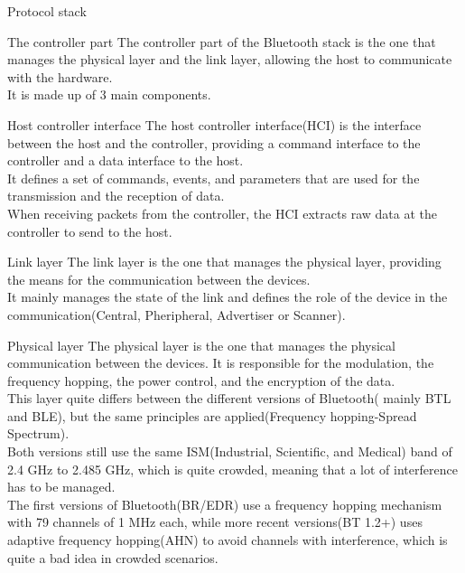 \begin{section}{Protocol stack}
  \begin{subsection}{The controller part}
    The controller part of the Bluetooth stack is the one that manages the physical layer and the
    link layer, allowing the host to communicate with the hardware.\\
    It is made up of 3 main components.
    \begin{subsubsection}{Host controller interface}
      The host controller interface(HCI) is the interface between the host and the controller, 
      providing a command interface to the controller and a data interface to the host.\\
      It defines a set of commands, events, and parameters that are used for the transmission and 
      the reception of data.\\
      When receiving packets from the controller, the HCI extracts raw data at the controller to
      send to the host.
    \end{subsubsection}
    \begin{subsubsection}{Link layer}
      The link layer is the one that manages the physical layer, providing the means for the 
      communication between the devices.\\
      It mainly manages the state of the link and defines the role of the device in the
      communication(Central, Pheripheral, Advertiser or Scanner).
    \end{subsubsection}
    \begin{subsubsection}{Physical layer}
      The physical layer is the one that manages the physical communication between the devices.
      It is responsible for the modulation, the frequency hopping, the power control, and the 
      encryption of the data.\\
      This layer quite differs between the different versions of Bluetooth( mainly BTL and BLE), but 
      the same principles are applied(Frequency hopping-Spread Spectrum).\\
      Both versions still use the same ISM(Industrial, Scientific, and Medical) band of 2.4 GHz to
      2.485 GHz, which is quite crowded, meaning that a lot of interference has to be managed.\\
      The first versions of Bluetooth(BR/EDR) use a frequency hopping mechanism with 79 channels of 
      1 MHz each, while more recent versions(BT 1.2+) uses adaptive frequency hopping(AHN) to avoid
      channels with interference, which is quite a bad idea in crowded scenarios.\\


\end{subsubsection}
\end{subsection}
\end{section}
